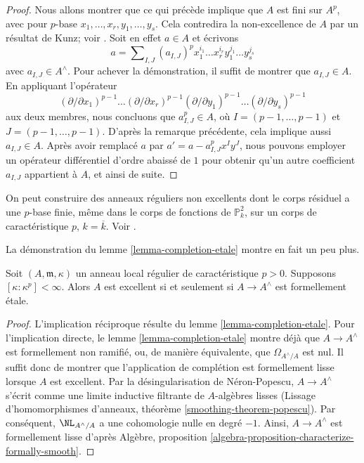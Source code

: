 \begin{proof}
\medskip\noindent
Nous allons montrer que ce qui précède implique que $A$ est fini
sur $A^p$, avec pour $p$-base $x_1, \ldots, x_r, y_1, \ldots, y_s$.
Cela contredira la non-excellence de $A$ par un résultat de
Kunz; voir \cite[Corollary 2.6]{Kun76}.
Soit en effet $a \in A$ et écrivons
$$
a =  \sum\nolimits_{I, J} (a_{I, J})^p
x_1^{i_1} \ldots x_r^{i_r} y_1^{j_1} \ldots y_s^{j_s}
$$
avec $a_{I, J} \in A^\wedge$. Pour achever la démonstration, il suffit de
montrer que $a_{I, J} \in A$. En appliquant l'opérateur
$$
(\partial/\partial x_1)^{p - 1} \ldots
(\partial/\partial x_r)^{p - 1}
(\partial/\partial y_1)^{p - 1} \ldots
(\partial/\partial y_s)^{p - 1}
$$
aux deux membres, nous concluons que $a_{I, J}^p \in A$, où
$I = (p - 1, \ldots, p - 1)$ et $J = (p - 1, \ldots, p - 1)$.
D'après la remarque précédente, cela implique aussi $a_{I, J} \in A$.
Après avoir remplacé $a$ par $a' = a - a_{I, J}^p x^I y^J$,
nous pouvons employer un opérateur différentiel d'ordre abaissé de $1$ pour obtenir
qu'un autre coefficient $a_{I, J}$ appartient à $A$, et ainsi de suite.
\end{proof}

\begin{remark}
\label{remark-reference-existence-regular-nonexcellent-rings}
On peut construire des anneaux réguliers non excellents dont le corps résiduel a une $p$-base finie,
même dans le corps de fonctions de $\mathbb{P}^2_k$, sur un corps de
caractéristique $p$, $k = \overline{k}$. Voir
\cite[$\mathsection 4.1$]{DS18}.
\end{remark}

\noindent
La démonstration du lemme \ref{lemma-completion-etale} montre en fait un peu plus.

\begin{lemma}
\label{lemma-excellent-regular-local-rings}
Soit $(A, \mathfrak m, \kappa)$ un anneau local régulier de caractéristique
$p > 0$. Supposons $[\kappa : \kappa^p] < \infty$. Alors $A$ est excellent
si et seulement si $A \to A^\wedge$ est formellement \'etale.
\end{lemma}

\begin{proof}
L'implication réciproque résulte du lemme \ref{lemma-completion-etale}.
Pour l'implication directe, le
lemme \ref{lemma-completion-etale}
montre déjà que $A \to A^\wedge$ est formellement non ramifié, ou, de manière équivalente,
que $\Omega_{A^\wedge/A}$ est nul.
Il suffit donc de montrer que l'application de complétion est formellement lisse lorsque
$A$ est excellent. Par la désingularisation de N\'eron-Popescu,
$A \to A^\wedge$ s'écrit comme une limite inductive filtrante
de $A$-algèbres lisses
(Lissage d'homomorphismes d'anneaux, théorème \ref{smoothing-theorem-popescu}).
Par conséquent, $\NL_{A^\wedge/A}$ a une cohomologie nulle en degré $-1$.
Ainsi, $A \to A^\wedge$ est formellement lisse d'après Algèbre, proposition
\ref{algebra-proposition-characterize-formally-smooth}.
\end{proof}










